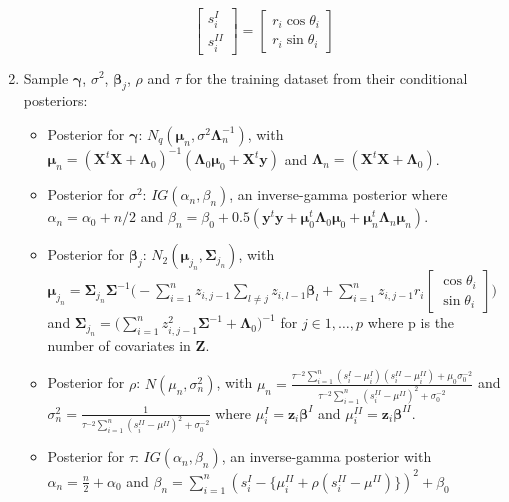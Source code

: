 \documentclass[11pt,]{article}
\begin{document}
\begin{appendices}
\begin{enumerate}
$$\begin{bmatrix} s^{I}_{i} \\ s^{II}_{i} \end{bmatrix} = \begin{bmatrix} r_i \cos \theta_i \\  r_i\sin \theta_i\end{bmatrix}$$

\item Sample $\boldsymbol{\gamma}$, $\sigma^2$, $\boldsymbol{\beta}_j$, $\rho$ and $\tau$ for the training dataset from their conditional posteriors:

\begin{itemize}
\item Posterior for $\boldsymbol{\gamma}$: $N_q(\boldsymbol{\mu}_n, \sigma^2\boldsymbol{\Lambda}^{-1}_n)$, with $\boldsymbol{\mu}_n = (\boldsymbol{X}^t\boldsymbol{X} + \boldsymbol{\Lambda}_0)^{-1}(\boldsymbol{\Lambda}_0\boldsymbol{\mu}_0 + \boldsymbol{X}^t\boldsymbol{y})$ and $\boldsymbol{\Lambda}_n = (\boldsymbol{X}^t\boldsymbol{X} + \boldsymbol{\Lambda}_0)$.
\item Posterior for $\sigma^2$: $IG(\alpha_{n}, \beta_{n})$, an inverse-gamma posterior where $\alpha_{n} = \alpha_0 + n/2$ and $\beta_{n} = \beta_0 + 0.5(\boldsymbol{y}^t\boldsymbol{y} + \boldsymbol{\mu}_{0}^t\boldsymbol{\Lambda}_0\boldsymbol{\mu}_{0} + \boldsymbol{\mu}_{n}^t\boldsymbol{\Lambda}_n\boldsymbol{\mu}_{n})$.
\item Posterior for $\boldsymbol{\beta}_j$: $N_2(\boldsymbol{\mu}_{j_{n}}, \boldsymbol{\Sigma}_{j_{n}})$, with $\boldsymbol{\mu}_{j_{n}} = \boldsymbol{\Sigma}_{j_{n}}\boldsymbol{\Sigma}^{-1}\Bigg(-\sum_{i=1}^{n}z_{i,j-1}\sum_{l\neq j}z_{i,l-1}\boldsymbol{\beta}_l + \sum_{i=1}^{n}z_{i,j-1}r_i\begin{bmatrix} \cos \theta_i \\ \sin \theta_i\end{bmatrix}\Bigg)$ and  $\boldsymbol{\Sigma}_{j_{n}} = \Big(\sum_{i=1}^{n}z_{i,j-1}^2\boldsymbol{\Sigma}^{-1}+\boldsymbol{\Lambda}_0\Big)^{-1}$ for $j \in 1, \dots, p$ where p is the number of covariates in $\boldsymbol{Z}$.
\item Posterior for $\rho$: $N(\mu_n, \sigma^2_n)$, with $\mu_n = \frac{\tau^{-2} \sum_{i=1}^{n}(s^{I}_{i} - \mu_i^{I})(s^{II}_{i} - \mu_i^{II}) + \mu_0\sigma_0^{-2}}{\tau^{-2}\sum_{i=1}^{n}(s^{II}_{i} - \mu^{II})^2 + \sigma_0^{-2}}$ and $\sigma_n^2 = \frac{1}{\tau^{-2}\sum_{i=1}^{n}(s^{II}_{i} - \mu^{II})^2 + \sigma_0^{-2}}$ where $\mu_i^{I} = \boldsymbol{z}_i\boldsymbol{\beta}^{I}$ and $\mu_i^{II} = \boldsymbol{z}_i\boldsymbol{\beta}^{II}$.
\item Posterior for $\tau$: $IG(\alpha_n, \beta_n)$, an inverse-gamma posterior with $\alpha_n = \frac{n}{2} + \alpha_0$ and $\beta_n = \sum\limits_{i = 1}^{n}(s^{I}_{i} - \{\mu_i^{II} + \rho(s^{II}_{i} - \mu^{II})\})^2 + \beta_0$
\end{itemize}


\end{enumerate}
\end{appendices}
\end{document}
